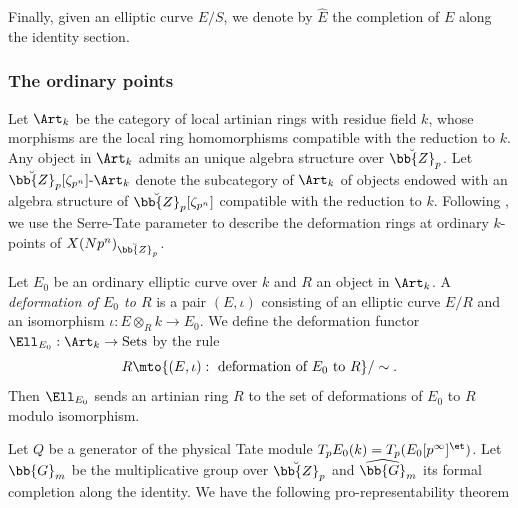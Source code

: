 Finally, given an elliptic curve $E/S$, we denote by $\widehat{E}$ the completion of $E$ along the identity section.

\subsubsection*{The ordinary points}

Let $\Art_k$ be the category of local artinian rings with residue field $k$, whose morphisms are the local ring homomorphisms compatible with the reduction to $k$. Any object in $\Art_k$ admits an unique algebra structure over $\breve{\bb{Z}}_p$. Let $\breve{\bb{Z}}_p[\zeta_{p^n}]\mbox{-}\Art_k$ denote the subcategory of $\Art_k$ of objects endowed with an algebra structure of $\breve{\bb{Z}}_p[\zeta_{p^n}]$ compatible with the reduction to $k$. Following \cite{katz1981serre}, we use the Serre-Tate parameter to describe the deformation rings at ordinary $k$-points of $X(Np^n)_{\breve{\bb{Z}}_p}$.

Let $E_0$ be an ordinary elliptic curve over $k$ and $R$ an object in $\Art_k$. A \textit{deformation of $E_0$ to $R$} is a pair $(E,\iota)$ consisting of an elliptic curve $E/R$ and an isomorphism $\iota:E\otimes_R k\to E_0$. We define the deformation functor $\Ell_{E_0}: \Art_k \to \mbox{Sets}$ by the rule\vspace*{-3pt}
\[
R \mto \{(E,\iota): \mbox{ deformation of $E_0$ to $R$}\}/\sim.
\]
Then $\Ell_{E_0}$ sends an artinian ring $R$ to the set of deformations of $E_0$ to $R$ modulo isomorphism.

Let $Q$ be a generator of the physical Tate module $T_pE_0(k)=T_p (E_0[p^\infty]^{\et})$. Let $\bb{G}_m$ be the multiplicative group over $\breve{\bb{Z}}_p$ and $\widehat{\bb{G}}_m$ its formal completion along the identity. We have the following pro-representability theorem

